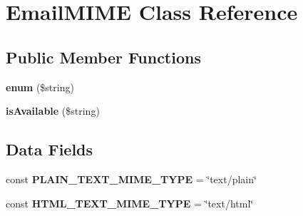 \hypertarget{class_email_m_i_m_e}{\section{Email\+M\+I\+M\+E Class Reference}
\label{class_email_m_i_m_e}
}
\subsection*{Public Member Functions}
\begin{DoxyCompactItemize}
\item 
\hypertarget{class_email_m_i_m_e_a7967c6e825979f8b2faefba3d95c3821}{{\bfseries enum} (\$string)}\label{class_email_m_i_m_e_a7967c6e825979f8b2faefba3d95c3821}

\item 
\hypertarget{class_email_m_i_m_e_a30537daeb912ea3e348c579c4f930841}{{\bfseries is\+Available} (\$string)}\label{class_email_m_i_m_e_a30537daeb912ea3e348c579c4f930841}

\end{DoxyCompactItemize}
\subsection*{Data Fields}
\begin{DoxyCompactItemize}
\item 
\hypertarget{class_email_m_i_m_e_ae360082cc38a8ad4ee871eeeec8d78a8}{const {\bfseries P\+L\+A\+I\+N\+\_\+\+T\+E\+X\+T\+\_\+\+M\+I\+M\+E\+\_\+\+T\+Y\+P\+E} = \char`\"{}text/plain\char`\"{}}\label{class_email_m_i_m_e_ae360082cc38a8ad4ee871eeeec8d78a8}

\item 
\hypertarget{class_email_m_i_m_e_a4a09fc2324787b687bd6d3e69845db6c}{const {\bfseries H\+T\+M\+L\+\_\+\+T\+E\+X\+T\+\_\+\+M\+I\+M\+E\+\_\+\+T\+Y\+P\+E} = \char`\"{}text/html\char`\"{}}\label{class_email_m_i_m_e_a4a09fc2324787b687bd6d3e69845db6c}

\end{DoxyCompactItemize}
